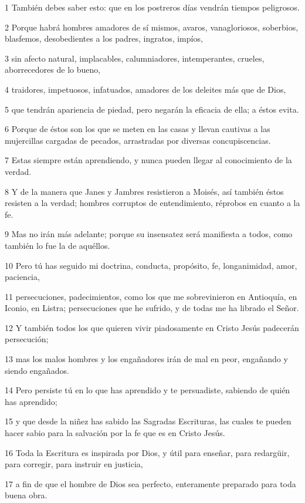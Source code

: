 \par 1 También debes saber esto: que en los postreros días vendrán tiempos peligrosos.
\par 2 Porque habrá hombres amadores de sí mismos, avaros, vanagloriosos, soberbios, blasfemos, desobedientes a los padres, ingratos, impíos,
\par 3 sin afecto natural, implacables, calumniadores, intemperantes, crueles, aborrecedores de lo bueno,
\par 4 traidores, impetuosos, infatuados, amadores de los deleites más que de Dios,
\par 5 que tendrán apariencia de piedad, pero negarán la eficacia de ella; a éstos evita.
\par 6 Porque de éstos son los que se meten en las casas y llevan cautivas a las mujercillas cargadas de pecados, arrastradas por diversas concupiscencias.
\par 7 Estas siempre están aprendiendo, y nunca pueden llegar al conocimiento de la verdad.
\par 8 Y de la manera que Janes y Jambres resistieron a Moisés, así también éstos resisten a la verdad; hombres corruptos de entendimiento, réprobos en cuanto a la fe.
\par 9 Mas no irán más adelante; porque su insensatez será manifiesta a todos, como también lo fue la de aquéllos.
\par 10 Pero tú has seguido mi doctrina, conducta, propósito, fe, longanimidad, amor, paciencia,
\par 11 persecuciones, padecimientos, como los que me sobrevinieron en Antioquía, en Iconio, en Listra; persecuciones que he sufrido, y de todas me ha librado el Señor.
\par 12 Y también todos los que quieren vivir piadosamente en Cristo Jesús padecerán persecución;
\par 13 mas los malos hombres y los engañadores irán de mal en peor, engañando y siendo engañados.
\par 14 Pero persiste tú en lo que has aprendido y te persuadiste, sabiendo de quién has aprendido;
\par 15 y que desde la niñez has sabido las Sagradas Escrituras, las cuales te pueden hacer sabio para la salvación por la fe que es en Cristo Jesús.
\par 16 Toda la Escritura es inspirada por Dios, y útil para enseñar, para redargüir, para corregir, para instruir en justicia,
\par 17 a fin de que el hombre de Dios sea perfecto, enteramente preparado para toda buena obra.

